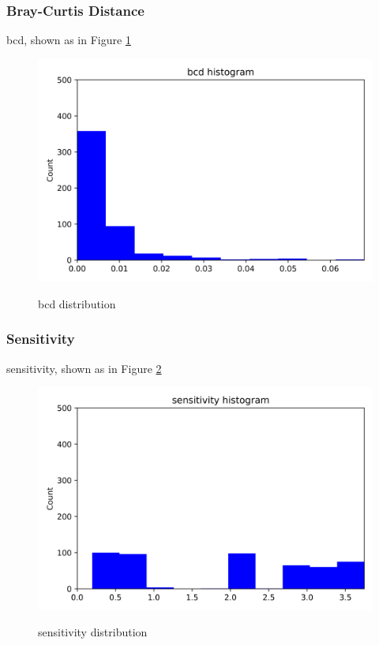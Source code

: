 \documentclass{article}
\begin{document}
\subsubsection{Bray-Curtis Distance}

bcd, shown as in Figure \ref{bcd-communitylevel}
\begin{figure}[htbp]
	\centering
	\includegraphics[width=\textwidth, keepaspectratio]{bcd-communitylevel.png}\\
	\caption{bcd distribution}
	\label{bcd-communitylevel}
\end{figure}

\subsubsection{Sensitivity}
sensitivity, shown as in Figure \ref{sensitivity-communitylevel}
\begin{figure}[htbp]
	\centering
	\includegraphics[width=\textwidth, keepaspectratio]{sensitivity-communitylevel.png}\\
	\caption{sensitivity distribution}
	\label{sensitivity-communitylevel}
\end{figure}
\end{document}
